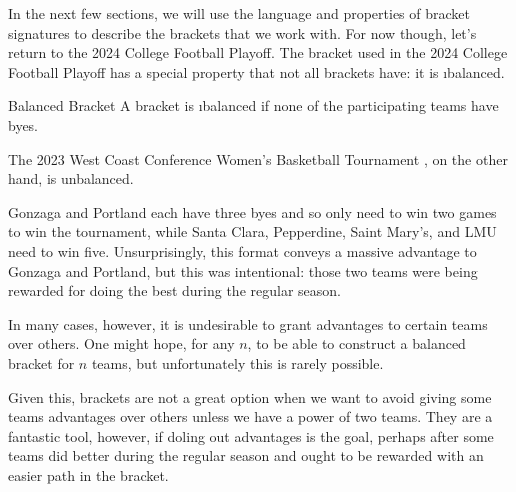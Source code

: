 {In the next few sections, we will use the language and properties of bracket signatures to describe the brackets that we work with. For now though, let's return to the 2024 College Football Playoff. The bracket used in the 2024 College Football Playoff has a special property that not all brackets have: it is \i{balanced}.

\begin{definition}{Balanced Bracket}{}
    A bracket is \i{balanced} if none of the participating teams have byes.
\end{definition} 

The 2023 West Coast Conference Women's Basketball Tournament \cite{wiki_wcc}, on the other hand, is unbalanced.

Gonzaga and Portland each have three byes and so only need to win two games to win the tournament, while Santa Clara, Pepperdine, Saint Mary's, and LMU need to win five. Unsurprisingly, this format conveys a massive advantage to Gonzaga and Portland, but this was intentional: those two teams were being rewarded for doing the best during the regular season.

In many cases, however, it is undesirable to grant advantages to certain teams over others. One might hope, for any $n$, to be able to construct a balanced bracket for $n$ teams, but unfortunately this is rarely possible.


Given this, brackets are not a great option when we want to avoid giving some teams advantages over others unless we have a power of two teams. They are a fantastic tool, however, if doling out advantages is the goal, perhaps after some teams did better during the regular season and ought to be rewarded with an easier path in the bracket.
}